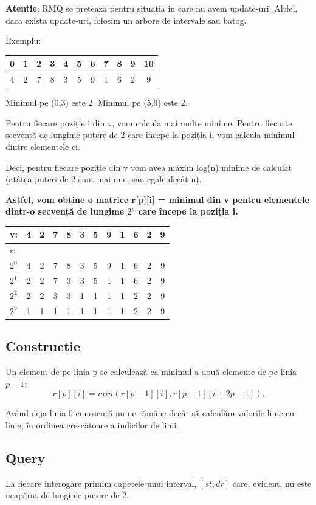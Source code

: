 \documentclass[11pt,a4paper]{article}
\theoremstyle{definition}
\theoremstyle{plain}
\theoremstyle{remark}
\begin{document}
\textbf{Atentie}: RMQ se preteaza pentru situatia in care nu avem update-uri. Altfel, daca exista update-uri, folosim un arbore de intervale sau batog.

Exemplu:

\bigskip
\begin{tabular}{|c|c|c|c|c|c|c|c|c|c|c|}
\hline
0 & 1 & 2 & 3 & 4 & 5 & 6 & 7 & 8 & 9 & 10\\
\hline
4 & 2 & 7 & 8 & 3 & 5 & 9 & 1 & 6 & 2 & 9 \\
\hline
\end{tabular}
\bigskip

Minimul pe (0,3) este 2. Minimul pe (5,9) este 2.

Pentru fiecare poziție i din v, vom calcula mai multe minime. Pentru fiecarte secvență de lungime putere de 2 care începe la poziția i, vom calcula minimul dintre elementele ei.

Deci, pentru fiecare poziție din v vom avea maxim log(n) minime de calculat (atâtea puteri de 2 sunt mai mici sau egale decât n).

\textbf{Astfel, vom obține o matrice r[p][i] = minimul din v pentru elementele dintr-o secvență de lungime $2^p$ care începe la poziția i.}

\bigskip
\begin{tabular}{|l|c|c|c|c|c|c|c|c|c|c|c|}
\hline
v: & 4 & 2 & 7 & 8 & 3 & 5 & 9 & 1 & 6 & 2 & 9 \\
\hline
r: & & & & & & & & & & & \\
\hline
$2^0$ & 4 & 2 & 7 & 8 & 3 & 5 & 9 & 1 & 6 & 2 & 9 \\
\hline
$2^1$ & 2 & 2 & 7 & 3 & 3 & 5 & 1 & 1 & 6 & 2 & 9 \\
\hline
$2^2$ & 2 & 2 & 3 & 3 & 1 & 1 & 1 & 1 & 2 & 2 & 9 \\
\hline
$2^3$ & 1 & 1 & 1 & 1 & 1 & 1 & 1 & 1 & 2 & 2 & 9 \\
\hline
\end{tabular}
\bigskip

\subsection*{Constructie}
Un element de pe linia p se calculează ca minimul a două elemente de pe linia $p-1$:
$$r[p][i] = min (r[p-1][i], r[p-1][i+2
p-1]).$$

Având deja linia 0 cunoscută nu ne rămâne decât să calculăm valorile linie cu linie, în ordinea crescătoare a indicilor de linii.

\subsection*{Query}
La fiecare interogare primim capetele unui interval, $[st, dr]$ care, evident, nu este neapărat de lungime putere de 2.
\end{document}
